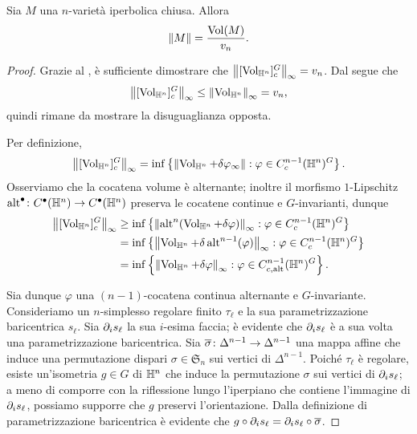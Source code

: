 \begin{proposition}
Sia $M$ una $n$-varietà iperbolica chiusa. Allora
\[
\left\lVert M\right\rVert=\frac{\operatorname{Vol}(M)}{v_n}.
\]
\end{proposition}
\begin{proof}
Grazie al , è sufficiente dimostrare che $\left\lVert [\operatorname{Vol}_{\mathbb{H}^n}]^G_c\right\rVert_\infty=v_n$. Dal  segue che
\[
\left\lVert [\operatorname{Vol}_{\mathbb{H}^n}]^G_c\right\rVert_\infty\le\left\lVert \operatorname{Vol}_{\mathbb{H}^n}\right\rVert_\infty=v_n,
\]
quindi rimane da mostrare la disuguaglianza opposta.

Per definizione,
\[
\left\lVert [\operatorname{Vol}_{\mathbb{H}^n}]^G_c\right\rVert_\infty=\inf\left\{\left\lVert \operatorname{Vol}_{\mathbb{H}^n}+\delta\varphi_\infty\right\rVert:\varphi\in C^{n-1}_c(\mathbb{H}^n)^G\right\}.
\]
Osserviamo che la cocatena volume è alternante; inoltre il morfismo $1$-Lipschitz $\map{\alt^\bul}{C^\bul(\HH^n)}{C^\bul(\HH^n)}$ preserva le cocatene continue e $G$-invarianti, dunque
\begin{align*}
\left\lVert [\operatorname{Vol}_{\mathbb{H}^n}]^G_c\right\rVert_\infty&\ge\inf\left\{\left\lVert \operatorname{alt}^n(\operatorname{Vol}_{\mathbb{H}^n}+\delta\varphi)\right\rVert_\infty:\varphi\in C^{n-1}_c(\mathbb{H}^n)^G\right\}\\
&=\inf\left\{\left\lVert \operatorname{Vol}_{\mathbb{H}^n}+\delta\operatorname{alt}^{n-1}(\varphi)\right\rVert_\infty:\varphi\in C^{n-1}_c(\mathbb{H}^n)^G\right\}\\
&=\inf\left\{\left\lVert \operatorname{Vol}_{\mathbb{H}^n}+\delta\varphi\right\rVert_\infty:\varphi\in C^{n-1}_{c,\operatorname{alt}}(\mathbb{H}^n)^G\right\}.
\end{align*}

Sia dunque $\varphi$ una $(n-1)$-cocatena continua alternante e $G$-invariante. Consideriamo un $n$-simplesso regolare finito $\tau_\ell$ e la sua parametrizzazione baricentrica $s_\ell$. Sia $\partial_is_\ell$ la sua $i$-esima faccia; è evidente che $\partial_is_\ell$ è a sua volta una parametrizzazione baricentrica. Sia $\map{\overline\sigma}{\Delta^{n-1}}{\Delta^{n-1}}$ una mappa affine che induce una permutazione dispari $\sigma\in\mathfrak{S}_n$ sui vertici di $\Delta^{n-1}$. Poiché $\tau_\ell$ è regolare, esiste un'isometria $g\in G$ di $\mathbb{H}^n$ che induce la permutazione $\sigma$ sui vertici di $\partial_is_\ell$; a meno di comporre con la riflessione lungo l'iperpiano che contiene l'immagine di $\partial_is_\ell$, possiamo supporre che $g$ preservi l'orientazione. Dalla definizione di parametrizzazione baricentrica è evidente che $g\circ\partial_is_\ell=\partial_is_\ell\circ\overline{\sigma}$.


\end{proof}
